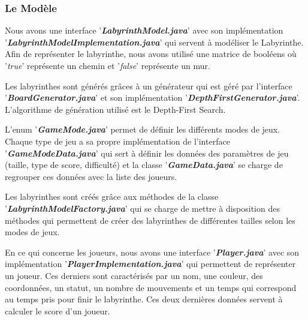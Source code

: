 \subsubsection{Le Modèle}
\label{subsubsec:modele}

Nous avons une interface '\textbf{\textit{LabyrinthModel.java}}' avec son implémentation
'\textbf{\textit{LabyrinthModelImplementation.java}}' qui servent à modéliser le Labyrinthe.
Afin de représenter le labyrinthe, nous avons utilisé une matrice de booléens
où '\textit{true}' représente un chemin et '\textit{false}' représente un mur.

Les labyrinthes sont générés grâces à un générateur qui est géré par
l'interface '\textbf{\textit{BoardGenerator.java}}' et son implémentation '\textbf{\textit{DepthFirstGenerator.java}}'.
L'algorithme de génération utilisé est le Depth-First Search.

L'enum '\textbf{\textit{GameMode.java}}' permet de définir les différents modes de jeux.
Chaque type de jeu a sa propre implémentation de l'interface '\textbf{\textit{GameModeData.java}}'
qui sert à définir les données des paramètres de jeu
(taille, type de score, difficulté) et la classe '\textbf{\textit{GameData.java}}' se charge de
regrouper ces données avec la liste des joueurs.

Les labyrinthes sont créés grâce aux méthodes de la classe
'\textbf{\textit{LabyrinthModelFactory.java}}' qui se charge de mettre à disposition des méthodes
qui permettent de créer des labyrinthes de différentes tailles selon les modes
de jeux.

En ce qui concerne les joueurs, nous avons une interface '\textbf{\textit{Player.java}}' avec son
implémentation '\textbf{\textit{PlayerImplementation.java}}' qui permettent de représenter un
joueur. Ces derniers sont caractérisés par un nom, une couleur, des coordonnées, un
statut, un nombre de mouvements et un temps qui correspond au temps pris pour finir le labyrinthe.
Ces deux dernières données servent à calculer le score d'un joueur.

